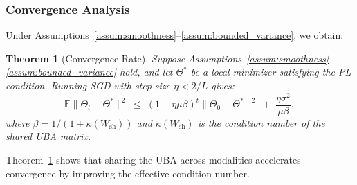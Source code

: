 \documentclass[letterpaper]{article} %
\theoremstyle{definition}                %
\theoremstyle{plain}                     %
\newtheorem{theorem}{Theorem}[section]
\theoremstyle{remark}                    %
\begin{document}
\subsubsection{Convergence Analysis}
\label{sec:conv1}

Under Assumptions~\ref{assum:smoothness}--\ref{assum:bounded_variance}, we obtain:

\begin{theorem}[Convergence Rate]
\label{thm:convergence}
Suppose Assumptions~\ref{assum:smoothness}--\ref{assum:bounded_variance} hold, and let $\Theta^*$ be a local minimizer satisfying the PL condition. Running SGD with step size $\eta<2/L$ gives:
\begin{equation}
\mathbb{E}\|\Theta_t - \Theta^*\|^2 
\;\le\; (1 - \eta\mu \beta)^t \|\Theta_0 - \Theta^*\|^2 
\;+\; \frac{\eta\sigma^2}{\mu\beta},
\end{equation}
where $\beta = 1/(1 + \kappa(W_{\mathrm{sh}}))$ and $\kappa(W_{\mathrm{sh}})$ is the condition number of the shared UBA matrix. 
\end{theorem}
Theorem~\ref{thm:convergence} shows that sharing the UBA across modalities accelerates convergence by improving the effective condition number.
\end{document}
